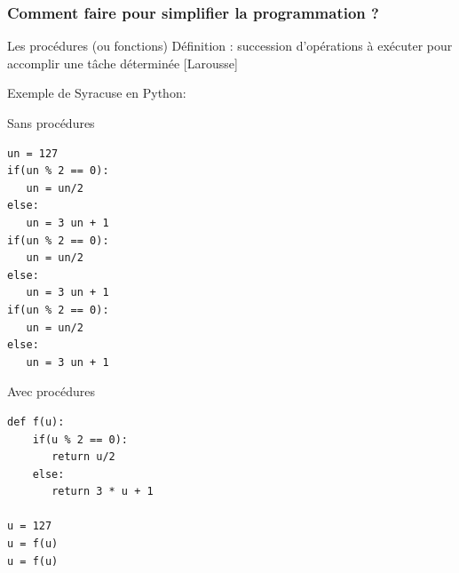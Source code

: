 \documentclass{beamer}
\begin{document}
\begin{frame}[fragile]
\frametitle{Comment faire pour simplifier la programmation ?}

\begin{block}{Les procédures (ou fonctions)}
Définition : succession d'opérations à exécuter pour accomplir une tâche déterminée [Larousse]
\end{block}

Exemple de Syracuse en Python: \\
\begin{minipage}[c]{0.45\textwidth}
Sans procédures
\begin{center}
\begin{footnotesize}
\begin{verbatim}
un = 127
if(un % 2 == 0):
   un = un/2
else:
   un = 3 un + 1
if(un % 2 == 0):
   un = un/2
else:
   un = 3 un + 1
if(un % 2 == 0):
   un = un/2
else:
   un = 3 un + 1
\end{verbatim}
\end{footnotesize}
\end{center}
\end{minipage}
\begin{minipage}[c]{0.45\textwidth}
Avec procédures
\begin{center}
\begin{footnotesize}
\begin{verbatim}
def f(u):
    if(u % 2 == 0):
       return u/2
    else:
       return 3 * u + 1

u = 127
u = f(u)
u = f(u)
\end{verbatim}
\end{footnotesize}
\end{center}
\vfill
\end{minipage}


\end{frame}
\end{document}
